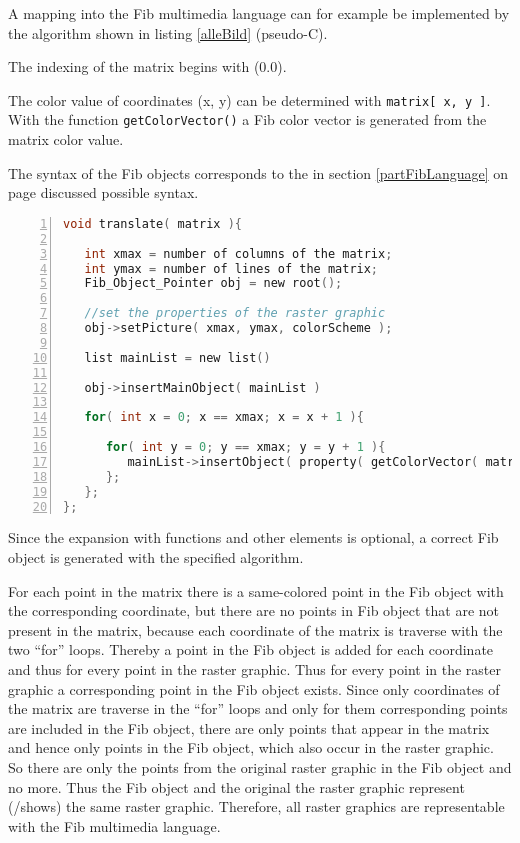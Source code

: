 A mapping into the Fib multimedia language can for example be implemented by the algorithm shown in listing \ref{alleBild} (pseudo-C).

\begin{flushleft}
The indexing of the matrix begins with (0.0).

The color value of coordinates (x, y) can be determined with \verb|matrix[ x, y ]|. With the function \verb|getColorVector()| a Fib color vector is generated from the matrix color value.

The syntax of the Fib objects corresponds to the in section \ref{partFibLanguage} on page \pageref{partFibLanguage} discussed possible syntax.

\end{flushleft}

\begin{lstlisting}[language=C, numbers=left, frame=single, caption={Algorithm to generate a correct Fib object from an image matrix}, label={alleBild}, breaklines, basicstyle=\footnotesize\ttfamily, numberstyle=\tiny]
void translate( matrix ){

   int xmax = number of columns of the matrix;
   int ymax = number of lines of the matrix;
   Fib_Object_Pointer obj = new root();

   //set the properties of the raster graphic
   obj->setPicture( xmax, ymax, colorScheme );

   list mainList = new list()

   obj->insertMainObject( mainList )

   for( int x = 0; x == xmax; x = x + 1 ){

      for( int y = 0; y == xmax; y = y + 1 ){
         mainList->insertObject( property( getColorVector( matrix[x,y] ) , p( (x,y) ) ) );
      };
   };
};
\end{lstlisting}
\bigskip\noindent
Since the expansion with functions and other elements is optional, a correct Fib object is generated with the specified algorithm.

\bigskip\noindent
For each point in the matrix there is a same-colored point in the Fib object with the corresponding coordinate, but there are no points in Fib object that are not present in the matrix, because each coordinate of the matrix is traverse with the two ``for'' loops. Thereby a point in the Fib object is added for each coordinate and thus for every point in the raster graphic. Thus for every point in the raster graphic a corresponding point in the Fib object exists.
Since only coordinates of the matrix are traverse in the ``for'' loops and only for them corresponding points are included in the Fib object, there are only points that appear in the matrix and hence only points in the Fib object, which also occur in the raster graphic.
So there are only the points from the original raster graphic in the Fib object and no more.
Thus the Fib object and the original the raster graphic represent (/shows) the same raster graphic. Therefore, all raster graphics are representable with the Fib multimedia language.


